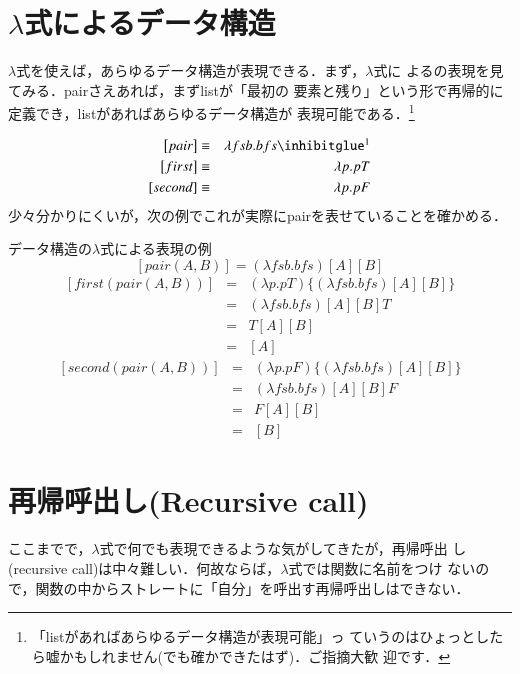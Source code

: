 \section{$\lambda$式によるデータ構造}
$\lambda$式を使えば，あらゆるデータ構造が表現できる．まず，$\lambda$式に
よるの表現を見てみる．pairさえあれば，まずlistが「最初の
要素と残り」という形で再帰的に定義でき，listがあればあらゆるデータ構造が
表現可能である．\footnote{「listがあればあらゆるデータ構造が表現可能」っ
ていうのはひょっとしたら嘘かもしれません(でも確かできたはず)．ご指摘大歓
迎です．}

\begin{eqnarray*}
 \left[pair\right] &\equiv& \lambda fsb . bfs \footnotemark \\
 \left[first\right] &\equiv& \lambda p . pT \\
 \left[second\right] &\equiv& \lambda p . pF
\end{eqnarray*}
\footnotetext[\value{myfootnote}]{$f$はfirst，$s$はsecond，$b$は
boolean．}
少々分かりにくいが，次の例でこれが実際にpairを表せていることを確かめる．

\begin{myexample}{データ構造の$\lambda$式による表現の例}
 \[
  \left[pair(A,B)\right] = (\lambda fsb . bfs) \left[A\right] \left[B\right]
 \]
 \begin{eqnarray*}
  \left[first(pair(A,B))\right] &=& (\lambda p . pT) \{(\lambda fsb .bfs)
   \left[A\right] \left[B\right] \} \\
  &=& (\lambda fsb . bfs) \left[A\right] \left[B\right] T \\
  &=& T \left[A\right] \left[B\right] \\
  &=& \left[A\right]
 \end{eqnarray*}
 \begin{eqnarray*}
  \left[second(pair(A,B))\right] &=& (\lambda p . pF) \{(\lambda fsb .bfs)
   \left[A\right] \left[B\right] \} \\
  &=& (\lambda fsb . bfs) \left[A\right] \left[B\right] F \\
  &=& F \left[A\right] \left[B\right] \\
  &=& \left[B\right]
 \end{eqnarray*}
\end{myexample}

\section{再帰呼出し(Recursive call)}
ここまでで，$\lambda$式で何でも表現できるような気がしてきたが，再帰呼出
し(recursive call)は中々難しい．何故ならば，$\lambda$式では関数に名前をつけ
ないので，関数の中からストレートに「自分」を呼出す再帰呼出しはできない．


